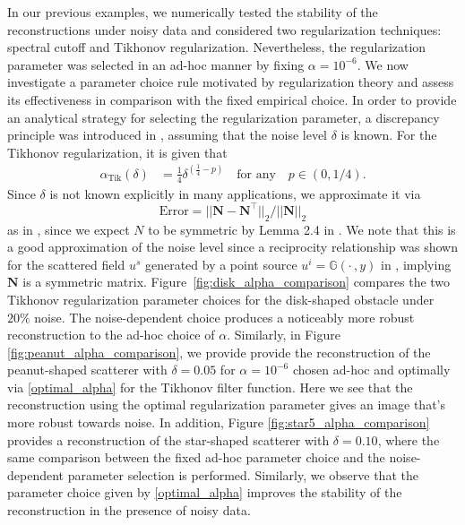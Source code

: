 \documentclass{article}
\begin{document}
In our previous examples, we numerically tested the stability of the reconstructions under noisy data and considered two regularization techniques: spectral cutoff and Tikhonov regularization. Nevertheless, the regularization parameter was selected in an ad-hoc manner by fixing $\alpha=10^{-6}$. We now investigate a parameter choice rule motivated by regularization theory and assess its effectiveness in comparison with the fixed empirical choice. In order to provide an analytical strategy for selecting the regularization parameter, a discrepancy principle was introduced in \cite{harris2023rfm}, assuming that the noise level $\delta$ is known. For the Tikhonov regularization, it is given that 
\begin{align}\label{optimal_alpha}
    \alpha_{\mathrm{Tik}}(\delta)&=\frac{1}{4}\delta^{\left(\frac{1}{4}-p\right)}\quad \text{for any}\quad p\in (0,1/4).
\end{align}
Since $\delta$ is not known explicitly in many applications, we approximate it via 
\[
\text{Error}=||\mathbf N-\mathbf N^\top||_2/||\mathbf N||_2
\]
as in \cite{HarrisKleefeld2026}, since we expect $N$ to be symmetric by Lemma 2.4 in \cite{BourgeoisHazard2020}.
We note that this is a good approximation of the noise level since a reciprocity relationship was shown for the scattered field $u^s$ generated by a point source $u^i=\mathbb G(\cdot \, ,y)$ in \cite{DongLi2024Uniqueness}, implying $\mathbf N$ is a symmetric matrix. Figure~\ref{fig:disk_alpha_comparison} compares the two Tikhonov regularization parameter choices for the disk-shaped obstacle under $20\%$ noise. The noise-dependent choice produces a noticeably more robust reconstruction to the ad-hoc choice of $\alpha$. Similarly,
in Figure \ref{fig:peanut_alpha_comparison}, we provide provide the reconstruction of the peanut-shaped scatterer with $\delta=0.05$ for $\alpha=10^{-6}$ chosen ad-hoc and optimally via \eqref{optimal_alpha} for the Tikhonov filter function. Here we see that the reconstruction using the optimal regularization parameter gives an image that's more robust towards noise. In addition, Figure \ref{fig:star5_alpha_comparison} provides a reconstruction of the star-shaped scatterer with $\delta=0.10$, where the same comparison between the fixed ad-hoc parameter choice and the noise-dependent parameter selection is performed. Similarly, we observe that the parameter choice given by \eqref{optimal_alpha} improves the stability of the reconstruction in the presence of noisy data.
\end{document}
